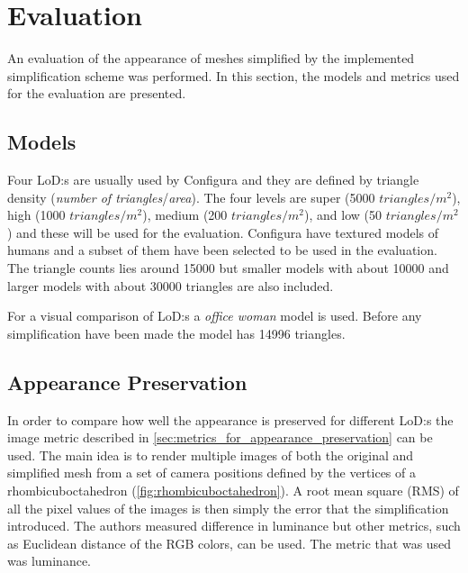  
\clearpage

  


\section{Evaluation} \label{sec:evaluation}
An evaluation of the appearance of meshes simplified by the implemented simplification scheme was performed. In this section, the models and metrics used for the evaluation are presented.



\subsection{Models}
Four LoD:s are usually used by Configura and they are defined by triangle density (\textit{number of triangles}/\textit{area}). The four levels are super (5000 $triangles/m^2$), high (1000 $triangles/m^2$), medium (200 $triangles/m^2$), and low  (50 $triangles/m^2$) and these will be used for the evaluation. Configura have textured models of humans and a subset of them have been selected to be used in the evaluation. The triangle counts lies around 15000 but smaller models with about 10000 and larger models with about 30000 triangles are also included.

For a visual comparison of LoD:s a \emph{office woman} model is used. Before any simplification have been made the model has 14996 triangles.

\subsection{Appearance Preservation}
In order to compare how well the appearance is preserved for different LoD:s the image metric described in \cref{sec:metrics_for_appearance_preservation} can be used. The main idea is to render multiple images of both the original and simplified mesh from a set of camera positions defined by the vertices of a rhombicuboctahedron (\cref{fig:rhombicuboctahedron}). A root mean square (RMS) of all the pixel values of the images is then simply the error that the simplification introduced. The authors \cite{lindstrom2000image} measured difference in luminance but other metrics, such as Euclidean distance of the RGB colors, can be used. The metric that was used was luminance.



